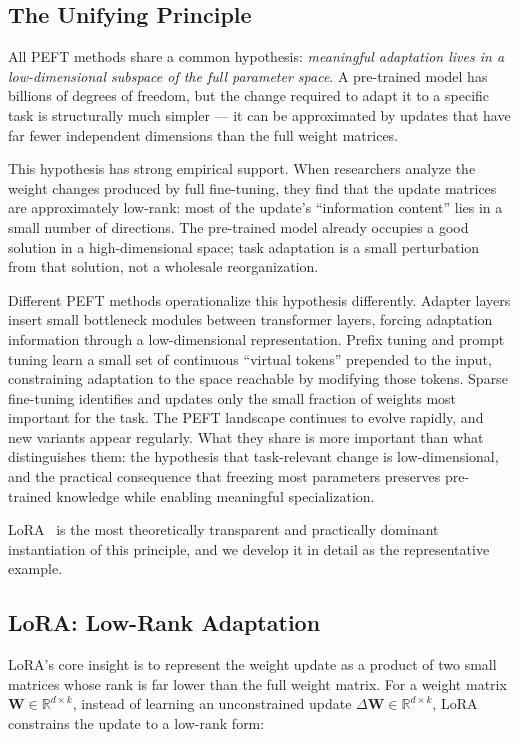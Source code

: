\documentclass{book}
\begin{document}
\subsection{The Unifying Principle}
\label{sec:peft_principle}

All PEFT methods share a common hypothesis: \emph{meaningful adaptation
lives in a low-dimensional subspace of the full parameter space}. A
pre-trained model has billions of degrees of freedom, but the change
required to adapt it to a specific task is structurally much simpler ---
it can be approximated by updates that have far fewer independent
dimensions than the full weight matrices.

This hypothesis has strong empirical support. When researchers analyze
the weight changes produced by full fine-tuning, they find that the update
matrices are approximately low-rank: most of the update's ``information
content'' lies in a small number of directions. The pre-trained model
already occupies a good solution in a high-dimensional space; task
adaptation is a small perturbation from that solution, not a wholesale
reorganization.

Different PEFT methods operationalize this hypothesis differently. Adapter
layers insert small bottleneck modules between transformer layers, forcing
adaptation information through a low-dimensional representation. Prefix
tuning and prompt tuning learn a small set of continuous ``virtual tokens''
prepended to the input, constraining adaptation to the space reachable by
modifying those tokens. Sparse fine-tuning identifies and updates only the
small fraction of weights most important for the task. The PEFT landscape
continues to evolve rapidly, and new variants appear regularly. What they
share is more important than what distinguishes them: the hypothesis that
task-relevant change is low-dimensional, and the practical consequence
that freezing most parameters preserves pre-trained knowledge while
enabling meaningful specialization.

LoRA~\cite{hu2021lora} is the most theoretically transparent and
practically dominant instantiation of this principle, and we develop it
in detail as the representative example.

\subsection{LoRA: Low-Rank Adaptation}
\label{sec:lora}

LoRA's core insight is to represent the weight update as a product of two
small matrices whose rank is far lower than the full weight matrix. For a
weight matrix $\mathbf{W} \in \mathbb{R}^{d \times k}$, instead of
learning an unconstrained update $\Delta\mathbf{W} \in \mathbb{R}^{d
\times k}$, LoRA constrains the update to a low-rank form:
\end{document}
